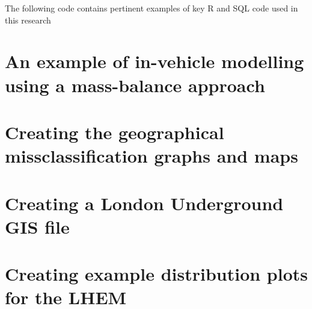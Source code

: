The following code contains pertinent examples of key R and SQL code used in this research

\section{An example of in-vehicle modelling using a mass-balance approach}
\label{code:in_vehicle_example}


\section{Creating the geographical missclassification graphs and maps}
\label{code:create_geographical_results}


\section{Creating a London Underground GIS file}
\label{code:make_tube_network_from_scratch}


\section{Creating example distribution plots for the LHEM}
\label{code:example_distribution_plot}



